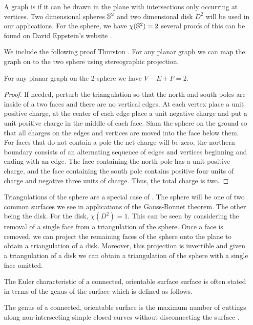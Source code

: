 A  graph  is  if it can be drawn in the plane with intersections only occurring
at vertices.
Two dimensional spheres $\mathbb{S}^2$ and two dimensional disk $D^2$ 
will be used in our applications.
For the sphere, we have $\chi(\mathbb{S}^2)=2$ 
several proofs of this can be found on David Eppstein's website \cite{eppstein-proofs}.




We include the following proof Thurston \cite{thurston}. 
For any planar graph we can map the graph on to the two sphere using stereographic projection.
 

\begin{theorem}\label{thm:euler}
For any planar graph on the 2-sphere we have $V-E+F=2.$
\end{theorem}

\begin{proof}
If needed, perturb the triangulation so that the north and south poles are 
inside of a two faces and there are no vertical edges. At each vertex place a unit positive
charge, at the center of each edge place a unit negative charge and put a unit positive
charge in the middle of each face. Slam the sphere on the ground so that all charges
on the edges and vertices are moved into the face below them. For faces that do not contain a pole
the net charge will be zero, the northern boundary consists of an alternating sequence
of edges and vertices  beginning  and ending with an edge.
The face containing the north pole has a unit positive charge, and the face containing the south
pole contains positive four units of charge and negative three units of charge.
Thus, the total charge is two.

\end{proof}

Triangulations of the sphere are a special case of .
The sphere will be one of two common surfaces we see in applications
of the Gauss-Bonnet theorem. The other being the disk.
For the disk, $\chi(D^2)=1$. This can be seen by considering
the removal of a single face from a triangulation of the sphere.
Once a face is removed, we can project the remaining faces of the sphere
onto the plane to obtain a triangulation of a disk. Moreover, this projection
is invertible and given a triangulation of a disk we can obtain a triangulation
of the sphere with a single face omitted.

The Euler characteristic of a connected, orientable surface surface is often 
stated in terms of the genus of the surface which is defined as follows.
\begin{definition}\label{def:genus}
	The genus of a connected, orientable surface is the maximum number of
	cuttings along non-intersecting simple closed curves without disconnecting
	the surface \cite{munkres}.
\end{definition}


